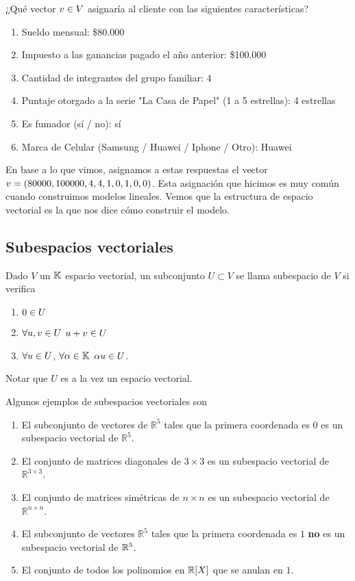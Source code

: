 \begin{aplicacion}
¿Qué vector $\vb \in V$ asignaría al cliente con las siguientes características?
\begin{enumerate}
\item Sueldo mensual: \$80.000
\item Impuesto a las ganancias pagado el año anterior: \$100.000
\item Cantidad de integrantes del grupo familiar: 4
\item Puntaje otorgado a la serie "La Casa de Papel" (1 a 5 estrellas): 4 estrellas
\item Es fumador (sí / no): sí
\item Marca de Celular (Samsung / Huawei / Iphone / Otro): Huawei
\end{enumerate}

En base a lo que vimos, asignamos a estas respuestas el vector $\vb = (80000, 100000, 4, 4, 1, 0, 1, 0, 0)$.
Esta asignación que hicimos es muy común cuando construimos modelos lineales. Vemos que la estructura de espacio vectorial es la que nos dice cómo construir el modelo.
\end{aplicacion}


\subsection{Subespacios vectoriales}


Dado $V$ un $\mathbb K$ espacio vectorial, un subconjunto $U\subset V$ se llama subespacio de $V$ si verifica
\begin{enumerate}
\item $\cero \in U$
\item $\forall \ub,\vb \in U$ $\ub+\vb\in U$
\item $\forall \ub \in U$, $\forall \alpha \in\mathbb K$ $\alpha \ub \in U$.
\end{enumerate}
Notar que  $U$  es a la vez un espacio vectorial.

\begin{ejemplo}
Algunos ejemplos de subespacios vectoriales son
\begin{enumerate}
\item El subconjunto de vectores de $\mathbb{R}^5$ tales que la primera coordenada es $0$ es un subespacio vectorial de $\mathbb{R}^5$.
\item El conjunto de matrices diagonales de $3 \times 3$ es un subespacio vectorial de $\mathbb{R}^{3 \times 3}$.
\item El conjunto de matrices simétricas de $n \times n$ es un subespacio vectorial de $\mathbb{R}^{n \times n}$.
\item El subconjunto de vectores $\mathbb{R}^5$ tales que la primera coordenada es $1$ \textbf{no} es un subespacio vectorial de $\mathbb R^5$.
\item El conjunto de todos los polinomios en $\mathbb R[X]$ que se anulan en $1$.
\end{enumerate}
\end{ejemplo}

